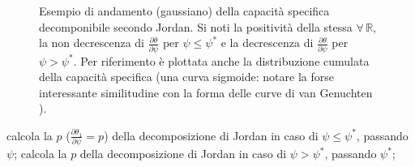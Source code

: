 \documentclass[
10pt, %
a4paper, %
oneside, %
headinclude,footinclude, %
BCOR5mm, %
]{scrartcl}
\begin{document}
		\begin{figure}[!h]
		\centering
		\caption{Esempio di andamento (gaussiano) della \textcolor{cyan!60!black}{capacità specifica} decomponibile secondo Jordan. Si noti la positività della stessa
		$\forall\, \mathbb{R} $, la non decrescenza di $\frac{\partial \theta}{\partial \psi}$ per $\psi\leq\psi^{*}$ e la decrescenza di $\frac{\partial \theta}{\partial \psi}$ per $\psi>\psi^{*}$. Per riferimento è plottata anche la \textcolor{red!60!black}{distribuzione cumulata della capacità specifica} (una curva sigmoide: notare la forse interessante similitudine con la forma delle curve di van Genuchten \cite{Genuchten1980}).}
		\end{figure}

	
		\subroutines
			 calcola la $p$ ($\frac{\partial\theta_{1}}{\partial\psi}=p$) della decomposizione di Jordan in caso di $\psi\leq\psi^{*}$, passando $\psi$;
			 calcola la $p$ della decomposizione di Jordan in caso di $\psi>\psi^{*}$, passando $\psi^{*}$;			 
\end{document}

